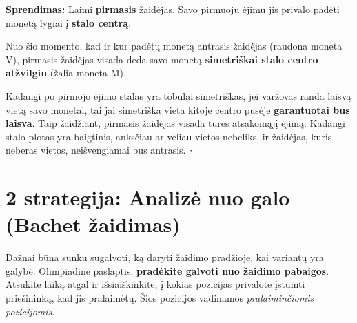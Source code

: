 \documentclass[11pt,a4paper]{scrartcl}
\newenvironment{solution}
    {\begin{list}{}{\setlength{\leftmargin}{10pt}\setlength{\rightmargin}{10pt}}\item[]}
    {\end{list}}
\begin{document}
\begin{solution}
\textbf{Sprendimas:}
Laimi \textbf{pirmasis} žaidėjas. 
Savo pirmuoju ėjimu jis privalo padėti monetą lygiai į \textbf{stalo centrą}.

\begin{center}
\end{center}

Nuo šio momento, kad ir kur padėtų monetą antrasis žaidėjas (raudona moneta V), pirmasis žaidėjas visada deda savo monetą \textbf{simetriškai stalo centro atžvilgiu} (žalia moneta M). 

Kadangi po pirmojo ėjimo stalas yra tobulai simetriškas, jei varžovas randa laisvą vietą savo monetai, tai jai simetriška vieta kitoje centro pusėje \textbf{garantuotai bus laisva}. 
Taip žaidžiant, pirmasis žaidėjas visada turės atsakomąjį ėjimą. Kadangi stalo plotas yra baigtinis, anksčiau ar vėliau vietos nebeliks, ir žaidėjas, kuris neberas vietos, neišvengiamai bus antrasis. \hfill $\square$
\end{solution}

\section{2 strategija: Analizė nuo galo (Bachet žaidimas)}

Dažnai būna sunku sugalvoti, ką daryti žaidimo pradžioje, kai variantų yra galybė. Olimpiadinė paslaptis: \textbf{pradėkite galvoti nuo žaidimo pabaigos}. Atsukite laiką atgal ir išsiaiškinkite, į kokias pozicijas privalote įstumti priešininką, kad jis pralaimėtų. Šios pozicijos vadinamos \textit{pralaiminčiomis pozicijomis}.
\end{document}
